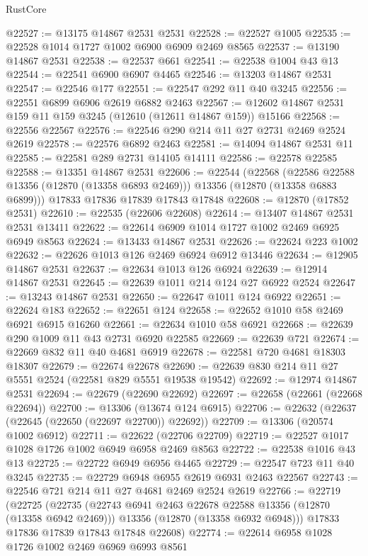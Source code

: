 \begin{lexlean}{RustCore}
\begin{coremodule}
@22527 := @13175 @14867 @2531 @2531
@22528 := @22527 @1005
@22535 := @22528 @1014 @1727 @1002 @6900 @6909 @2469 @8565
@22537 := @13190 @14867 @2531
@22538 := @22537 @661
@22541 := @22538 @1004 @43 @13
@22544 := @22541 @6900 @6907 @4465
@22546 := @13203 @14867 @2531
@22547 := @22546 @177
@22551 := @22547 @292 @11 @40 @3245
@22556 := @22551 @6899 @6906 @2619 @6882 @2463
@22567 := @12602 @14867 @2531 @159 @11 @159 @3245 (@12610 (@12611 @14867 @159)) @15166
@22568 := @22556 @22567
@22576 := @22546 @290 @214 @11 @27 @2731 @2469 @2524 @2619
@22578 := @22576 @6892 @2463
@22581 := @14094 @14867 @2531 @11
@22585 := @22581 @289 @2731 @14105 @14111
@22586 := @22578 @22585
@22588 := @13351 @14867 @2531
@22606 := @22544
    (@22568
      (@22586 @22588 @13356 (@12870 (@13358 @6893 @2469)))
      @13356
      (@12870 (@13358 @6883 @6899)))
    @17833
    @17836
    @17839
    @17843
    @17848
@22608 := @12870 (@17852 @2531)
@22610 := @22535 (@22606 @22608)
@22614 := @13407 @14867 @2531 @2531 @13411
@22622 := @22614 @6909 @1014 @1727 @1002 @2469 @6925 @6949 @8563
@22624 := @13433 @14867 @2531
@22626 := @22624 @223 @1002
@22632 := @22626 @1013 @126 @2469 @6924 @6912 @13446
@22634 := @12905 @14867 @2531
@22637 := @22634 @1013 @126 @6924
@22639 := @12914 @14867 @2531
@22645 := @22639 @1011 @214 @124 @27 @6922 @2524
@22647 := @13243 @14867 @2531
@22650 := @22647 @1011 @124 @6922
@22651 := @22624 @183
@22652 := @22651 @124
@22658 := @22652 @1010 @58 @2469 @6921 @6915 @16260
@22661 := @22634 @1010 @58 @6921
@22668 := @22639 @290 @1009 @11 @43 @2731 @6920 @22585
@22669 := @22639 @721
@22674 := @22669 @832 @11 @40 @4681 @6919
@22678 := @22581 @720 @4681 @18303 @18307
@22679 := @22674 @22678
@22690 := @22639 @830 @214 @11 @27 @5551 @2524 (@22581 @829 @5551 @19538 @19542)
@22692 := @12974 @14867 @2531
@22694 := @22679 (@22690 @22692)
@22697 := @22658 (@22661 (@22668 @22694))
@22700 := @13306 (@13674 @124 @6915)
@22706 := @22632 (@22637 (@22645 (@22650 (@22697 @22700)) @22692))
@22709 := @13306 (@20574 @1002 @6912)
@22711 := @22622 (@22706 @22709)
@22719 := @22527 @1017 @1028 @1726 @1002 @6949 @6958 @2469 @8563
@22722 := @22538 @1016 @43 @13
@22725 := @22722 @6949 @6956 @4465
@22729 := @22547 @723 @11 @40 @3245
@22735 := @22729 @6948 @6955 @2619 @6931 @2463 @22567
@22743 := @22546 @721 @214 @11 @27 @4681 @2469 @2524 @2619
@22766 := @22719
    (@22725
      (@22735
        (@22743 @6941 @2463 @22678 @22588 @13356 (@12870 (@13358 @6942 @2469)))
        @13356
        (@12870 (@13358 @6932 @6948)))
      @17833
      @17836
      @17839
      @17843
      @17848
      @22608)
@22774 := @22614 @6958 @1028 @1726 @1002 @2469 @6969 @6993 @8561

\end{coremodule}
\end{lexlean}
